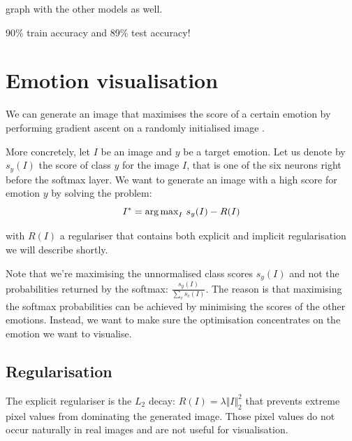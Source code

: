 graph with the other models as well.

90\% train accuracy and 89\% test accuracy!

\newpage
\section{Emotion visualisation}
We can generate an image that maximises the score of a certain emotion by performing gradient ascent on a randomly initialised image \cite{class-vis}.

More concretely, let $I$ be an image and $y$ be a target emotion. Let us denote by $s_y(I)$ the score of class $y$ for the image $I$, that is one of the six neurons right before the softmax layer. We want to generate an image with a high score for emotion $y$ by solving the problem:
\begin{equation}
I^* = \text{arg\,max}_I ~s_y(I) - R(I)
\end{equation}

with $R(I)$ a regulariser that contains both explicit and implicit regularisation we will describe shortly.

Note that we're maximising the unnormalised class scores $s_y(I)$ and not the probabilities returned by the softmax: $\frac{s_y(I)}{\sum_c s_c(I)}$. The reason is that maximising the softmax probabilities can be achieved by minimising the scores of the other emotions. Instead, we want to make sure the optimisation concentrates on the emotion we want to visualise. 

\subsection{Regularisation}

The explicit regulariser is the $L_2$ decay: $R(I) = \lambda \Vert I \Vert_2^2$ that prevents extreme pixel values from dominating the generated image. Those pixel values do not occur naturally in real images and are not useful for visualisation.

